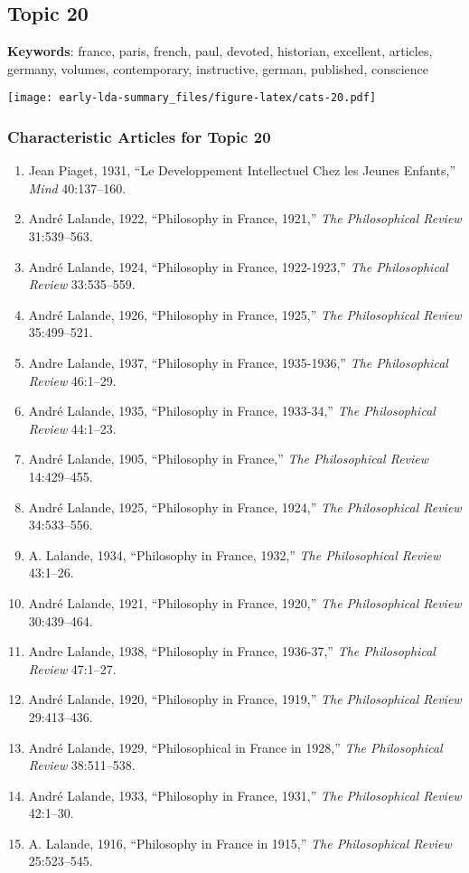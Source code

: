 \documentclass[
]{article}
\begin{document}
\newpage

\hypertarget{topic-20}{%
\subsection{Topic 20}\label{topic-20}}

\textbf{Keywords}: france, paris, french, paul, devoted, historian,
excellent, articles, germany, volumes, contemporary, instructive,
german, published, conscience

\texttt{[image: early-lda-summary\_files/figure-latex/cats-20.pdf]}
\newpage 

\hypertarget{characteristic-articles-for-topic-20}{%
\subsubsection{Characteristic Articles for Topic
20}\label{characteristic-articles-for-topic-20}}

\begin{enumerate}
\def\labelenumi{\arabic{enumi}.}
\item
  Jean Piaget, 1931, ``Le Developpement Intellectuel Chez les Jeunes
  Enfants,'' \emph{Mind} 40:137--160.
\item
  André Lalande, 1922, ``Philosophy in France, 1921,'' \emph{The
  Philosophical Review} 31:539--563.
\item
  André Lalande, 1924, ``Philosophy in France, 1922-1923,'' \emph{The
  Philosophical Review} 33:535--559.
\item
  André Lalande, 1926, ``Philosophy in France, 1925,'' \emph{The
  Philosophical Review} 35:499--521.
\item
  Andre Lalande, 1937, ``Philosophy in France, 1935-1936,'' \emph{The
  Philosophical Review} 46:1--29.
\item
  André Lalande, 1935, ``Philosophy in France, 1933-34,'' \emph{The
  Philosophical Review} 44:1--23.
\item
  André Lalande, 1905, ``Philosophy in France,'' \emph{The Philosophical
  Review} 14:429--455.
\item
  André Lalande, 1925, ``Philosophy in France, 1924,'' \emph{The
  Philosophical Review} 34:533--556.
\item
  A. Lalande, 1934, ``Philosophy in France, 1932,'' \emph{The
  Philosophical Review} 43:1--26.
\item
  André Lalande, 1921, ``Philosophy in France, 1920,'' \emph{The
  Philosophical Review} 30:439--464.
\item
  Andre Lalande, 1938, ``Philosophy in France, 1936-37,'' \emph{The
  Philosophical Review} 47:1--27.
\item
  André Lalande, 1920, ``Philosophy in France, 1919,'' \emph{The
  Philosophical Review} 29:413--436.
\item
  André Lalande, 1929, ``Philosophical in France in 1928,'' \emph{The
  Philosophical Review} 38:511--538.
\item
  André Lalande, 1933, ``Philosophy in France, 1931,'' \emph{The
  Philosophical Review} 42:1--30.
\item
  A. Lalande, 1916, ``Philosophy in France in 1915,'' \emph{The
  Philosophical Review} 25:523--545.
\end{enumerate}
\end{document}
